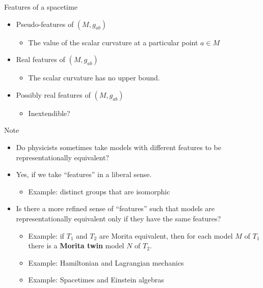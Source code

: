 \documentclass{beamer}
\begin{document}
\begin{frame}{Features of a spacetime}

\begin{itemize}
\item Pseudo-features of $(M,g_{ab})$
  \begin{itemize}
  \item The value of the scalar curvature at a particular point
    $a\in M$
  \end{itemize}

\item Real features of $(M,g_{ab})$
  \begin{itemize}
  \item The scalar curvature has no upper bound.
  \end{itemize}
\end{itemize}

\begin{itemize}
\item Possibly real features of $(M,g_{ab})$
  \begin{itemize}
  \item Inextendible?
  \end{itemize}

\end{itemize}
\end{frame}

\begin{frame}{Note}

  \begin{itemize}
\item Do physicists sometimes take models with different features to
  be representationally equivalent?
\item Yes, if we take ``features'' in a liberal sense.

  \begin{itemize}
  \item Example: distinct groups that are isomorphic
  \end{itemize}
\item Is there a more refined sense of ``features'' such that models
  are representationally equivalent only if they have the same
  features?

  \begin{itemize}
  \item Example: if $T_1$ and $T_2$ are Morita equivalent, then
    for each model $M$ of $T_1$ there is a \textbf{Morita twin}
    model $N$ of $T_2$.
  \item Example: Hamiltonian and Lagrangian mechanics
  \item Example: Spacetimes and Einstein algebras
  \end{itemize}
\end{itemize}
\end{frame}
\end{document}
